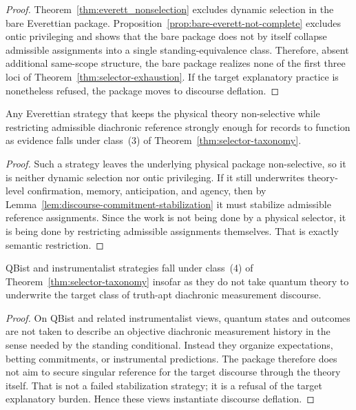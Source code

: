 \begin{proof}
Theorem~\ref{thm:everett_nonselection} excludes dynamic selection in the bare Everettian package.
Proposition~\ref{prop:bare-everett-not-complete} excludes ontic privileging and shows that the bare
package does not by itself collapse admissible assignments into a single standing-equivalence class.
Therefore, absent additional same-scope structure, the bare package realizes none of the first three loci
of Theorem~\ref{thm:selector-exhaustion}. If the target explanatory practice is nonetheless refused, the
package moves to discourse deflation.
\end{proof}

\begin{proposition}
\label{prop:everett-semantic}
Any Everettian strategy that keeps the physical theory non-selective while restricting admissible
diachronic reference strongly enough for records to function as evidence falls under class~(3) of
Theorem~\ref{thm:selector-taxonomy}.
\end{proposition}

\begin{proof}
Such a strategy leaves the underlying physical package non-selective, so it is neither dynamic selection
nor ontic privileging. If it still underwrites theory-level confirmation, memory, anticipation, and
agency, then by Lemma~\ref{lem:discourse-commitment-stabilization} it must stabilize admissible
reference assignments. Since the work is not being done by a physical selector, it is being done by
restricting admissible assignments themselves. That is exactly semantic restriction.
\end{proof}

\begin{proposition}
\label{prop:qbism-deflation}
QBist and instrumentalist strategies \citep{fuchs2014} fall under class~(4) of
Theorem~\ref{thm:selector-taxonomy} insofar as they do not take quantum theory to underwrite the
target class of truth-apt diachronic measurement discourse.
\end{proposition}

\begin{proof}
On QBist and related instrumentalist views, quantum states and outcomes are not taken to describe an
objective diachronic measurement history in the sense needed by the standing conditional. Instead they
organize expectations, betting commitments, or instrumental predictions. The package therefore does
not aim to secure singular reference for the target discourse through the theory itself. That is not a
failed stabilization strategy; it is a refusal of the target explanatory burden. Hence these views
instantiate discourse deflation.
\end{proof}

